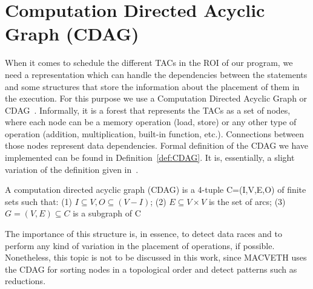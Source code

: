 \section{Computation Directed Acyclic Graph (CDAG)}
When it comes to schedule the different TACs in the ROI of our program, we need
a representation which can handle the dependencies between the statements and
some structures that store the information about the placement of them in the
execution. For this purpose we use a Computation Directed Acyclic Graph or
CDAG~\cite{bib:CDAGdefinition}. Informally, it is a forest that represents the
TACs as a set of nodes, where
each node can be a memory operation (load, store) or any other type of
operation (addition, multiplication, built-in function, etc.). Connections
between those nodes represent data dependencies. Formal
definition of the CDAG we have implemented can be found in
Definition~\ref{def:CDAG}. It is, essentially, a slight variation
of the definition given in~\cite{bib:CDAGdefinition}.

\theoremstyle{definition}
\begin{definition}\label{def:CDAG}
	A computation directed acyclic graph (CDAG) is a 4-tuple C=(I,V,E,O) of
	finite sets such that: (1) $I \subseteq V, O \subseteq (V-I)$; (2) $E
		\subseteq V
		\times V$ is the set of arcs; (3) $G=(V,E) \subseteq C$ is a subgraph 
		of C
\end{definition}

The importance of this structure is, in essence, to detect data races and to 
perform any kind of variation in the placement of operations, if possible. 
Nonetheless, this topic is not to be discussed in this work, since MACVETH uses 
the CDAG for sorting nodes in a topological order and detect patterns such as 
reductions.


